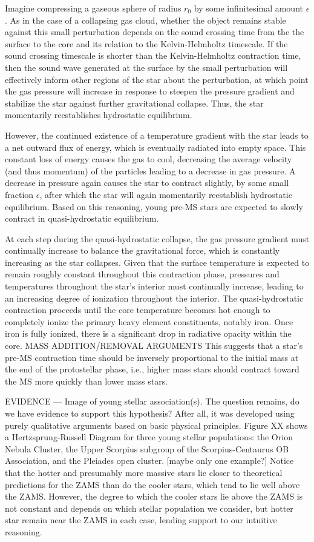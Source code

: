 Imagine compressing a gaseous sphere of radius $r_0$ by some infinitesimal amount $\epsilon$. As in the case of a collapsing gas cloud, whether the object remains stable against this small perturbation depends on the sound crossing time from the the surface to the core and its relation to the Kelvin-Helmholtz timescale. If the sound crossing timescale is shorter than the Kelvin-Helmholtz contraction time, then the sound wave generated at the surface by the small perturbation will effectively inform other regions of the star about the perturbation, at which point the gas pressure will increase in response to steepen the pressure gradient and stabilize the star against further gravitational collapse. Thus, the star momentarily reestablishes hydrostatic equilibrium. 

However, the continued existence of a temperature gradient with the star leads to a net outward flux of energy, which is eventually radiated into empty space. This constant loss of energy causes the gas to cool, decreasing the average velocity (and thus momentum) of the particles leading to a decrease in gas pressure. A decrease in pressure again causes the star to contract slightly, by some small fraction $\epsilon$, after which the star will again momentarily reestablish hydrostatic equilibrium. Based on this reasoning, young pre-MS stars are expected to slowly contract in quasi-hydrostatic equilibrium.

At each step during the quasi-hydrostatic collapse, the gas pressure gradient must continually increase to balance the gravitational force, which is constantly increasing as the star collapses. Given that the surface temperature is expected to remain roughly constant throughout this contraction phase, pressures and temperatures throughout the star's interior must continually increase, leading to an increasing degree of ionization throughout the interior. The quasi-hydrostatic contraction proceeds until the core temperature becomes hot enough to completely ionize the primary heavy element constituents, notably iron. Once iron is fully ionized, there is a significant drop in radiative opacity within the core. 
MASS ADDITION/REMOVAL ARGUMENTS
This suggests that a star's pre-MS contraction time should be inversely proportional to the initial mass at the end of the protostellar phase, i.e., higher mass stars should contract toward the MS more quickly than lower mass stars. 

EVIDENCE --- Image of young stellar association(s).
The question remains, do we have evidence to support this hypothesis? After all, it was developed using purely qualitative arguments based on basic physical principles. Figure XX shows a Hertzsprung-Russell Diagram for three young stellar populations: the Orion Nebula Cluster, the Upper Scorpius subgroup of the Scorpius-Centaurus OB Association, and the Pleiades open cluster. [maybe only one example?] Notice that the hotter and presumably more massive stars lie closer to theoretical predictions for the ZAMS than do the cooler stars, which tend to lie well above the ZAMS. However, the degree to which the cooler stars lie above the ZAMS is not constant and depends on which stellar population we consider, but hotter star remain near the ZAMS in each case, lending support to our intuitive reasoning.